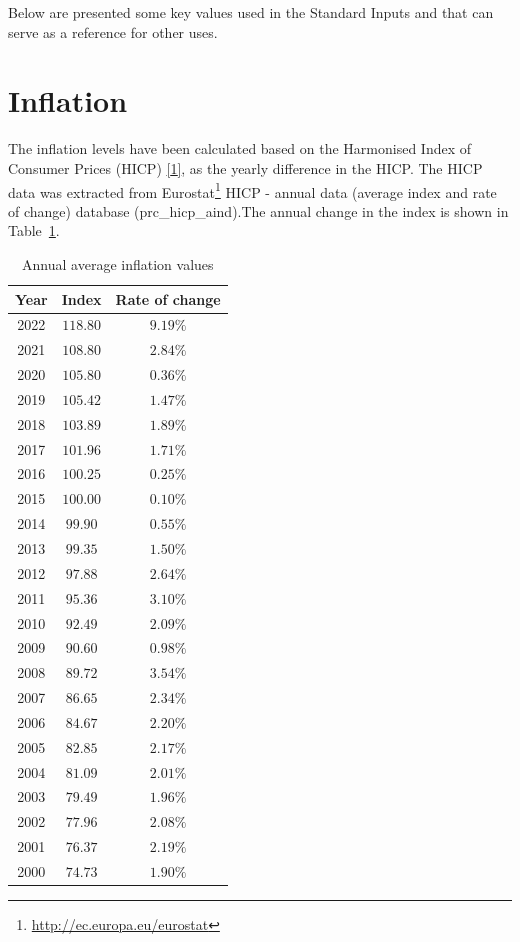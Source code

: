 \documentclass[
  11pt,
  a4paper,
]{book}
\DeclareRobustCommand{\href}[2]{#2\footnote{\url{#1}}}
\begin{document}

Below are presented some key values used in the Standard Inputs and that
can serve as a reference for other uses.

\hypertarget{inflation}{%
\section*{Inflation}\label{inflation}}


The inflation levels have been calculated based on the Harmonised Index
of Consumer Prices (HICP)
\protect\hyperlink{ref-eurostat:HICP}{{[}1{]}}, as the yearly difference
in the HICP. The HICP data was extracted from
\href{http://ec.europa.eu/eurostat}{Eurostat} HICP - annual data
(average index and rate of change) database (prc\_hicp\_aind).The annual
change in the index is shown in Table~\ref{tbl-inflation-table}.

\hypertarget{tbl-inflation-table}{}
\begin{longtable}{ccc}
\caption{\label{tbl-inflation-table}Annual average inflation values }\tabularnewline

\toprule
Year & Index & Rate of change \\ 
\midrule
2022 & $118.80$ & $9.19\%$ \\ 
2021 & $108.80$ & $2.84\%$ \\ 
2020 & $105.80$ & $0.36\%$ \\ 
2019 & $105.42$ & $1.47\%$ \\ 
2018 & $103.89$ & $1.89\%$ \\ 
2017 & $101.96$ & $1.71\%$ \\ 
2016 & $100.25$ & $0.25\%$ \\ 
2015 & $100.00$ & $0.10\%$ \\ 
2014 & $99.90$ & $0.55\%$ \\ 
2013 & $99.35$ & $1.50\%$ \\ 
2012 & $97.88$ & $2.64\%$ \\ 
2011 & $95.36$ & $3.10\%$ \\ 
2010 & $92.49$ & $2.09\%$ \\ 
2009 & $90.60$ & $0.98\%$ \\ 
2008 & $89.72$ & $3.54\%$ \\ 
2007 & $86.65$ & $2.34\%$ \\ 
2006 & $84.67$ & $2.20\%$ \\ 
2005 & $82.85$ & $2.17\%$ \\ 
2004 & $81.09$ & $2.01\%$ \\ 
2003 & $79.49$ & $1.96\%$ \\ 
2002 & $77.96$ & $2.08\%$ \\ 
2001 & $76.37$ & $2.19\%$ \\ 
2000 & $74.73$ & $1.90\%$ \\ 
\bottomrule
\end{longtable}
\end{document}
